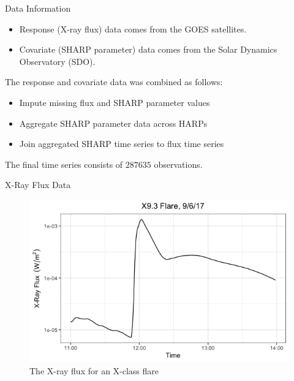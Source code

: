 \documentclass{beamer}
\begin{document}
\begin{frame}{Data Information}
    \begin{itemize}
        \item Response (X-ray flux) data comes from the GOES satellites.
        \item Covariate (SHARP parameter) data comes from the Solar Dynamics Observatory (SDO).
    \end{itemize}

    The response and covariate data was combined as follows:
    \begin{itemize}
        \item Impute missing flux and SHARP parameter values
        \item Aggregate SHARP parameter data across HARPs 
        \item Join aggregated SHARP time series to flux time series
    \end{itemize}
    The final time series consists of $\num[group-separator={,}]{287635}$ observations.
\end{frame}

\begin{frame}{X-Ray Flux Data}
    \begin{figure}
        \centering
        \includegraphics[scale=0.5]{flare_flux_example.png}
        \caption{The X-ray flux for an X-class flare}
        \label{fig:flare_flux_example}
    \end{figure}
\end{frame}
\end{document}
